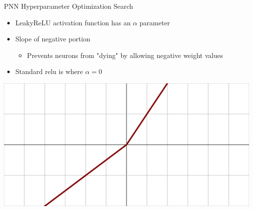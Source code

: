 \documentclass[aspectratio=169,xcolor=table]{beamer}
\begin{document}
    \begin{frame}[t]{PNN Hyperparameter Optimization Search}
      \begin{itemize}
        \item LeakyReLU activation function has an $\alpha$ parameter
        \item Slope of negative portion
        \begin{itemize}
          \item Prevents neurons from "dying" by allowing negative weight values
        \end{itemize}
        \item Standard relu is where $\alpha=0$
      \end{itemize}
      \centering
      \includegraphics[height=.4\textheight,keepaspectratio=true]{Activation_prelu.svg.png}
    \end{frame}
\end{document}
